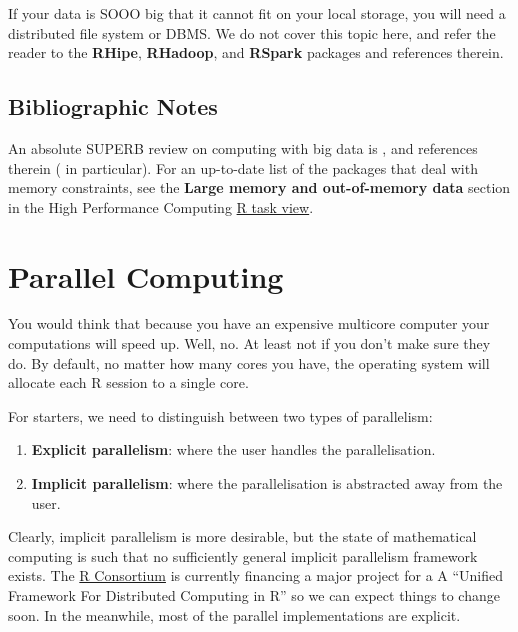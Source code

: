 \documentclass[]{book}
\providecommand{\tightlist}{%
  \setlength{\itemsep}{0pt}\setlength{\parskip}{0pt}}
\theoremstyle{definition}
\theoremstyle{definition}
\theoremstyle{remark}
\begin{document}
If your data is SOOO big that it cannot fit on your local storage, you
will need a distributed file system or DBMS. We do not cover this topic
here, and refer the reader to the \textbf{RHipe}, \textbf{RHadoop}, and
\textbf{RSpark} packages and references therein.

\section{Bibliographic Notes}\label{bibliographic-notes-11}

An absolute SUPERB review on computing with big data is
\citet{wang2015statistical}, and references therein
(\citet{kane2013scalable} in particular). For an up-to-date list of the
packages that deal with memory constraints, see the \textbf{Large memory
and out-of-memory data} section in the High Performance Computing
\href{https://cran.r-project.org/web/views/HighPerformanceComputing.html}{R
task view}.

\chapter{Parallel Computing}\label{parallel}

You would think that because you have an expensive multicore computer
your computations will speed up. Well, no. At least not if you don't
make sure they do. By default, no matter how many cores you have, the
operating system will allocate each R session to a single core.

For starters, we need to distinguish between two types of parallelism:

\begin{enumerate}
\def\labelenumi{\arabic{enumi}.}
\tightlist
\item
  \textbf{Explicit parallelism}: where the user handles the
  parallelisation.
\item
  \textbf{Implicit parallelism}: where the parallelisation is abstracted
  away from the user.
\end{enumerate}

Clearly, implicit parallelism is more desirable, but the state of
mathematical computing is such that no sufficiently general implicit
parallelism framework exists. The
\href{https://www.r-consortium.org/projects/awarded-projects}{R
Consortium} is currently financing a major project for a A ``Unified
Framework For Distributed Computing in R'' so we can expect things to
change soon. In the meanwhile, most of the parallel implementations are
explicit.
\end{document}
